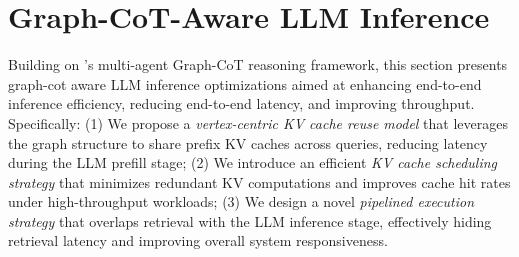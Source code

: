 
\section{Graph-CoT-Aware LLM Inference} \label{sec: optimization}



Building on \projectname’s multi-agent Graph-CoT reasoning framework, this section presents graph-cot aware LLM inference optimizations aimed at enhancing end-to-end inference efficiency, reducing end-to-end latency, and improving throughput. Specifically:
(1) We propose a \textit{vertex-centric KV cache reuse model} that leverages the graph structure to share prefix KV caches across queries, reducing latency during the LLM prefill stage;
(2) We introduce an efficient \textit{KV cache scheduling strategy} that minimizes redundant KV computations and improves cache hit rates under high-throughput workloads; 
(3) We design a novel \textit{pipelined execution strategy} that overlaps retrieval with the LLM inference stage, effectively hiding retrieval latency and improving overall system responsiveness.


